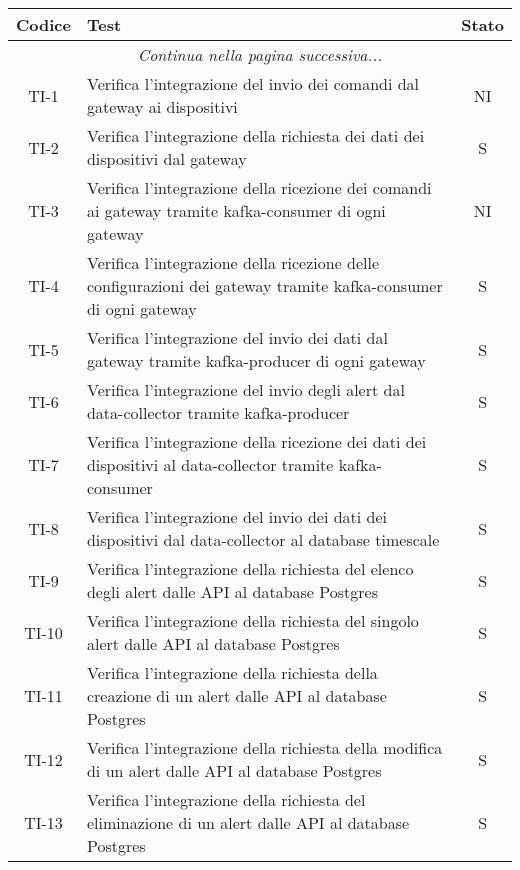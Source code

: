 		\begin{center}
			\begin{longtable}{|c|p{12cm}|c|}
			\hline
			\rowcolor{lighter-grayer}
			\textbf{Codice} & \textbf{Test} & \textbf{Stato}  \\ %
			\hline
			\endhead
			\hline
	        \multicolumn{3}{|c|}{\textit{Continua nella pagina successiva...}}\\
	        \hline
	        \endfoot
	        \endlastfoot

			\hline
			TI-1 & Verifica l'integrazione del invio dei comandi dal gateway ai dispositivi & NI \\
			\hline
			TI-2 & Verifica l'integrazione della richiesta dei dati dei dispositivi dal gateway & S \\
			\hline
			TI-3 & Verifica l'integrazione della ricezione dei comandi ai gateway tramite kafka-consumer di ogni gateway & NI \\
			\hline
			TI-4 & Verifica l'integrazione della ricezione delle configurazioni dei gateway tramite kafka-consumer di ogni gateway & S \\
			\hline
			TI-5 & Verifica l'integrazione del invio dei dati dal gateway tramite kafka-producer di ogni gateway & S \\
			\hline
			TI-6 & Verifica l'integrazione del invio degli alert dal data-collector tramite kafka-producer & S \\
			\hline
			TI-7 & Verifica l'integrazione della ricezione dei dati dei dispositivi al data-collector tramite kafka-consumer & S \\
			\hline
			TI-8 & Verifica l'integrazione del invio dei dati dei dispositivi dal data-collector al database timescale & S \\
			\hline
			TI-9 & Verifica l'integrazione della richiesta del elenco degli alert dalle API al database Postgres & S \\
			\hline
			TI-10 & Verifica l'integrazione della richiesta del singolo alert dalle API al database Postgres & S \\
			\hline
			TI-11 & Verifica l'integrazione della richiesta della creazione di un alert dalle API al database Postgres & S \\
			\hline
			TI-12 & Verifica l'integrazione della richiesta della modifica di un alert dalle API al database Postgres & S \\
			\hline
			TI-13 & Verifica l'integrazione della richiesta del eliminazione di un alert dalle API al database Postgres & S \\

\end{longtable}
\end{center}
